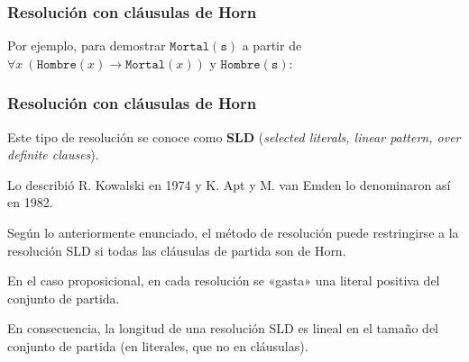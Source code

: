 \documentclass{beamer}    %
\def\false{\mbox{\fontspec{FreeSerif} ⊥}}
\def\fun#1{\texttt{#1}}
\begin{document}
\begin{frame}
 \frametitle{Resolución con cláusulas de Horn}

 Por ejemplo, para demostrar $\fun{Mortal}(\fun s)$ a partir
 de $\forall x\ (\fun{Hombre}(x) \rightarrow
 \fun{Mortal}(x))$ y $\fun{Hombre}(\fun s)$:
\vspace{1cm}

\end{frame}


\begin{frame}
 \frametitle{Resolución con cláusulas de Horn}

 Este tipo de resolución se conoce como {\bf SLD}
 (\emph{selected literals, linear pattern, over definite
   clauses}).
 \vspace{3mm}

 {\small Lo describió {\sc R. Kowalski} en 1974 y {\sc
     K. Apt} y {\sc M. van Emden} lo denominaron así en
   1982.}
 \vspace{5mm}

 \pause

 Según lo anteriormente enunciado, el método de resolución
 puede restringirse a la resolución SLD si todas las
 cláusulas de partida son de Horn.
 \vspace{5mm}

 \pause

 En el caso proposicional, en cada resolución se «gasta» una
 literal positiva del conjunto de partida.

 En consecuencia, la longitud de una resolución SLD es
 lineal en el tamaño del conjunto de partida {\small (en
   literales, que no en cláusulas)}.
\end{frame}
\end{document}
